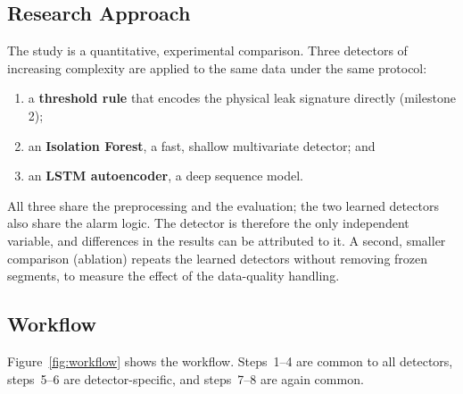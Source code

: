 \subsection{Research Approach}
The study is a quantitative, experimental comparison. Three detectors of increasing complexity are applied to the same data under the same protocol:
\begin{enumerate}[itemsep=2pt]
  \item a \textbf{threshold rule} that encodes the physical leak signature directly (milestone 2);
  \item an \textbf{Isolation Forest}, a fast, shallow multivariate detector; and
  \item an \textbf{LSTM autoencoder}, a deep sequence model.
\end{enumerate}
All three share the preprocessing and the evaluation; the two learned detectors also share the alarm logic. The detector is therefore the only independent variable, and differences in the results can be attributed to it. A second, smaller comparison (ablation) repeats the learned detectors without removing frozen segments, to measure the effect of the data-quality handling.

\subsection{Workflow}
Figure~\ref{fig:workflow} shows the workflow. Steps~1--4 are common to all detectors, steps~5--6 are detector-specific, and steps~7--8 are again common.

